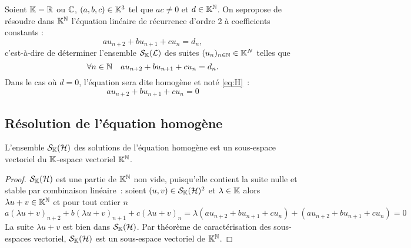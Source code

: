 Soient $\mathbb{K}=\mathbb{R}$ ou $\mathbb{C}$, $(a,b,c) \in \mathbb{K}^3$ tel que $ac \neq 0$ et $d \in \mathbb{K}^{\mathbb{N}}$. On sepropose de résoudre dans $\mathbb{K}^{\mathbb{N}}$ l'équation linéaire de récurrence d'ordre 2 à coefficients constants :
\begin{equation}
  au_{n+2}+bu_{n+1}+cu_n = d_n \label{eq:S} \tag{$\Lb$},
\end{equation}
c'est-à-dire de déterminer l'ensemble $\mathcal{S}_{\mathbb{K}}(\mathcal{L})$ des suites $(u_n)_{n \in \mathbb{N}} \in \mathbb{K}^N$ telles que
\begin{equation}
  \forall n \in \mathbb{N} \quad au_{n+2}+bu_{n+1}+cu_n = d_n.
\end{equation}
Dans le cas où $d=0$, l'équation sera dite homogène et noté \eqref{eq:H}~:
\begin{equation}
  au_{n+2}+bu_{n+1}+cu_n = 0 \label{eq:H} \tag{$\H$}
\end{equation}

\subsection{Résolution de l'équation homogène}

\begin{prop}
  L'ensemble $\mathcal{S}_{\mathbb{K}}(\mathcal{H})$ des solutions de l'équation homogène est un sous-espace vectoriel du $\mathbb{K}$-espace vectoriel $\mathbb{K}^{\mathbb{N}}$.
\end{prop}
\begin{proof}
  $\mathcal{S}_{\mathbb{K}}(\mathcal{H})$ est une partie de $\mathbb{K}^{\mathbb{N}}$ non vide, puisqu'elle contient la suite nulle et stable par combinaison linéaire~:
  soient $(u,v) \in \mathcal{S}_{\mathbb{K}}(\mathcal{H})^2$ et $\lambda \in \mathbb{K}$ alors $\lambda u +v \in \mathbb{K}^{\mathbb{N}}$ et pour tout entier $n$
  \begin{equation}
    a(\lambda u+v)_{n+2} +b(\lambda u+v)_{n+1} +c(\lambda u+v)_n = \lambda (au_{n+2}+bu_{n+1}+cu_n) + (au_{n+2}+bu_{n+1}+cu_n)=0
  \end{equation}
  La suite $\lambda u+v$ est bien dans $\mathcal{S}_{\mathbb{K}}(\mathcal{H})$. Par théorème de caractérisation des sous-espaces vectoriel, $\mathcal{S}_{\mathbb{K}}(\mathcal{H})$ est un sous-espace vectoriel de $\mathbb{K}^{\mathbb{N}}$.
\end{proof}

